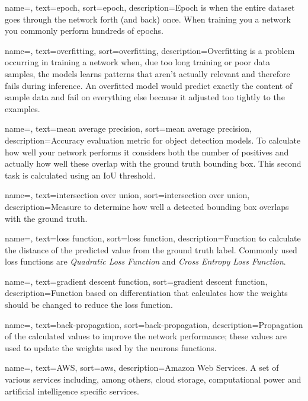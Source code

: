 {
	name=,
	text=epoch,
	sort=epoch,
	description={Epoch is when the entire dataset goes through the network forth (and back) once. When training you a network you commonly perform hundreds of epochs.}
}

{
	name=,
	text=overfitting,
	sort=overfitting,
	description={Overfitting is a problem occurring in training a network when, due too long training or poor data samples, the models learns patterns that aren't actually relevant and therefore fails during inference. An overfitted model would predict exactly the content of sample data and fail on everything else because it adjusted too tightly to the examples.}
}

{
	name=,
	text=mean average precision,
	sort=mean average precision,
	description={Accuracy evaluation metric for object detection models. To calculate how well your network performs it considers both the number of positives and actually how well these overlap with the ground truth bounding box. This second task is calculated using an IoU threshold.}
}

{
	name=,
	text=intersection over union,
	sort=intersection over union,
	description={Measure to determine how well a detected bounding box overlaps with the ground truth.}
}

{
	name=,
	text=loss function,
	sort=loss function,
	description={Function to calculate the distance of the predicted value from the ground truth label. Commonly used loss functions are \emph{Quadratic Loss Function} and \emph{Cross Entropy Loss Function}.}
}

{
	name=,
	text=gradient descent function,
	sort=gradient descent function,
	description={Function based on differentiation that calculates how the weights should be changed to reduce the loss function.}
}

{
	name=,
	text=back-propagation,
	sort=back-propagation,
	description={Propagation of the calculated values to improve the network performance; these values are used to update the weights used by the neurons functions.}
}

{
	name=,
	text=AWS,
	sort=aws,
	description={Amazon Web Services. A set of various services including, among others, cloud storage, computational power and artificial intelligence specific services.}
}


